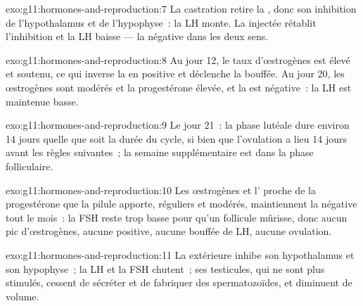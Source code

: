 \begin{solution}{exo:g11:hormones-and-reproduction:7}
La castration retire la , donc son inhibition de
l'hypothalamus et de l'hypophyse~: la LH monte. La 
injectée rétablit l'inhibition et la LH baisse --- la 
négative dans les deux sens.
\end{solution}

\begin{solution}{exo:g11:hormones-and-reproduction:8}
Au jour 12, le taux d'œstrogènes est élevé et soutenu, ce qui inverse
la  en positive et déclenche la bouffée. Au jour 20, les
œstrogènes sont modérés et la progestérone élevée, et la 
est négative~: la LH est maintenue basse.
\end{solution}

\begin{solution}{exo:g11:hormones-and-reproduction:9}
Le jour 21~: la phase lutéale dure environ 14 jours quelle que soit la
durée du cycle, si bien que l'ovulation a lieu 14 jours avant les
règles suivantes~; la semaine supplémentaire est dans la phase
folliculaire.
\end{solution}

\begin{solution}{exo:g11:hormones-and-reproduction:10}
Les œstrogènes et l' proche de la progestérone que la pilule
apporte, réguliers et modérés, maintiennent la  négative
tout le mois~: la FSH reste trop basse pour qu'un follicule mûrisse,
donc aucun pic d'œstrogènes, aucune  positive, aucune
bouffée de LH, aucune ovulation.
\end{solution}

\begin{solution}{exo:g11:hormones-and-reproduction:11}
La  extérieure inhibe son hypothalamus et son hypophyse~;
la LH et la FSH chutent~; ses testicules, qui ne sont plus stimulés,
cessent de sécréter et de fabriquer des spermatozoïdes, et diminuent de
volume.
\end{solution}

